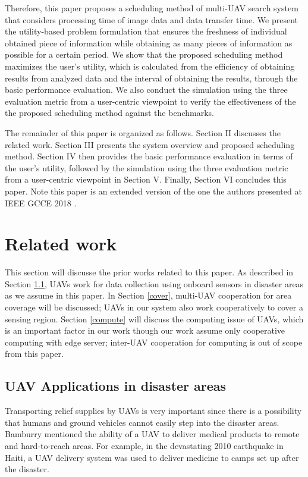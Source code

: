 \documentclass{ieeeaccess}
\begin{document}
Therefore, this paper proposes a scheduling method of multi-UAV search system that considers processing time of image data and data transfer time.
We present the utility-based problem formulation that ensures the freshness of individual obtained piece of information while obtaining as many pieces of information as possible for a certain period.
We show that the proposed scheduling method maximizes the user's utility, which is calculated from the efficiency of obtaining results from analyzed data and the interval of obtaining the results, through the basic performance evaluation.
We also conduct the simulation using the three evaluation metric from a user-centric viewpoint to verify the effectiveness of the the proposed scheduling method against the benchmarks.

The remainder of this paper is organized as follows. Section II discusses the related work. Section III presents the system overview and proposed scheduling method. Section IV then provides the basic performance evaluation in terms of the user's utility, followed by the simulation using the three evaluation metric from a user-centric viewpoint in Section V. Finally, Section VI concludes this paper. Note this paper is an extended version of the one the authors presented at IEEE GCCE 2018 \cite{GCCE2018}.

\section{Related work}
This section will discusse the prior works related to this paper.
As described in Section \ref{app}, UAVs work for data collection using onboard sensors in disaster areas as we assume in this paper.
In Section \ref{cover}, multi-UAV cooperation for area coverage will be discussed; UAVs in our system also work cooperatively to cover a sensing region.
%
Section \ref{compute} will discuss the computing issue of UAVs, which is an important factor in our work though our work assume only cooperative computing with edge server; inter-UAV cooperation for computing is out of scope from this paper.

\subsection{UAV Applications in disaster areas}\label{app}
Transporting relief supplies by UAVs is very important since there is a possibility that humans and ground vehicles cannot easily step into the disaster areas.
Bamburry mentioned the ability of a UAV to deliver medical products to remote and hard-to-reach areas\cite{Bamburry2015}.
For example, in the devastating 2010 earthquake in Haiti, a UAV delivery system was used to deliver medicine to camps set up after the disaster\cite{May2015}.
\end{document}

